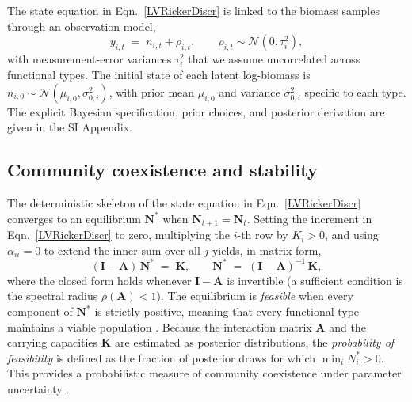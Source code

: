 \documentclass[12pt]{article}
\begin{document}
The state equation in Eqn.~\ref{LVRickerDiscr} is linked to the biomass samples through an observation model,
\begin{equation}\label{LVR_Obs_model}
	y_{i,t} \;=\; n_{i,t} + \rho_{i,t}, \qquad \rho_{i,t} \sim \mathcal{N}(0,\tau_{i}^{2}),
\end{equation}
with measurement-error variances $\tau_{i}^{2}$ that we assume uncorrelated across functional types. The initial state of each latent log-biomass is $n_{i,0}\sim\mathcal{N}(\mu_{i,0},\sigma_{0,i}^{2})$, with prior mean $\mu_{i,0}$ and variance $\sigma_{0,i}^{2}$ specific to each type. The explicit Bayesian specification, prior choices, and posterior derivation are given in the SI Appendix.

\subsection*{Community coexistence and stability}

The deterministic skeleton of the state equation in Eqn.~\ref{LVRickerDiscr} converges to an equilibrium $\mathbf{N}^{*}$ when $\mathbf{N}_{t+1}=\mathbf{N}_{t}$. Setting the increment in Eqn.~\ref{LVRickerDiscr} to zero, multiplying the $i$-th row by $K_{i}>0$, and using $\alpha_{ii}=0$ to extend the inner sum over all $j$ yields, in matrix form,
\begin{equation}\label{eqn:equilibrium_main}
	(\mathbf{I}-\mathbf{A})\,\mathbf{N}^{*} \;=\; \mathbf{K}, \qquad \mathbf{N}^{*} \;=\; (\mathbf{I}-\mathbf{A})^{-1}\,\mathbf{K},
\end{equation}
where the closed form holds whenever $\mathbf{I}-\mathbf{A}$ is invertible (a sufficient condition is the spectral radius $\rho(\mathbf{A})<1$). The equilibrium is \textit{feasible} when every component of $\mathbf{N}^{*}$ is strictly positive, meaning that every functional type maintains a viable population \citep{Roberts1974}. Because the interaction matrix $\mathbf{A}$ and the carrying capacities $\mathbf{K}$ are estimated as posterior distributions, the \textit{probability of feasibility} is defined as the fraction of posterior draws for which $\min_{i}N_{i}^{*}>0$. This provides a probabilistic measure of community coexistence under parameter uncertainty \citep{Almaraz2024}.
\end{document}
